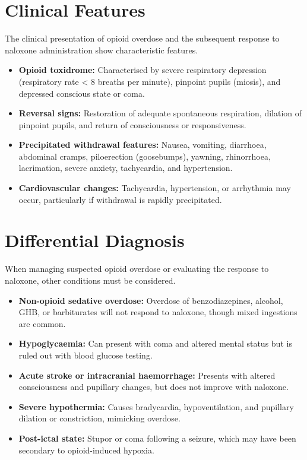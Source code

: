 \section*{Clinical Features}
The clinical presentation of opioid overdose and the subsequent response to naloxone administration show characteristic features.
\begin{itemize}
    \item \textbf{Opioid toxidrome:} Characterised by severe respiratory depression (respiratory rate < 8 breaths per minute), pinpoint pupils (miosis), and depressed conscious state or coma.
    \item \textbf{Reversal signs:} Restoration of adequate spontaneous respiration, dilation of pinpoint pupils, and return of consciousness or responsiveness.
    \item \textbf{Precipitated withdrawal features:} Nausea, vomiting, diarrhoea, abdominal cramps, piloerection (goosebumps), yawning, rhinorrhoea, lacrimation, severe anxiety, tachycardia, and hypertension.
    \item \textbf{Cardiovascular changes:} Tachycardia, hypertension, or arrhythmia may occur, particularly if withdrawal is rapidly precipitated.
\end{itemize}

\section*{Differential Diagnosis}
When managing suspected opioid overdose or evaluating the response to naloxone, other conditions must be considered.
\begin{itemize}
    \item \textbf{Non-opioid sedative overdose:} Overdose of benzodiazepines, alcohol, GHB, or barbiturates will not respond to naloxone, though mixed ingestions are common.
    \item \textbf{Hypoglycaemia:} Can present with coma and altered mental status but is ruled out with blood glucose testing.
    \item \textbf{Acute stroke or intracranial haemorrhage:} Presents with altered consciousness and pupillary changes, but does not improve with naloxone.
    \item \textbf{Severe hypothermia:} Causes bradycardia, hypoventilation, and pupillary dilation or constriction, mimicking overdose.
    \item \textbf{Post-ictal state:} Stupor or coma following a seizure, which may have been secondary to opioid-induced hypoxia.
\end{itemize}

